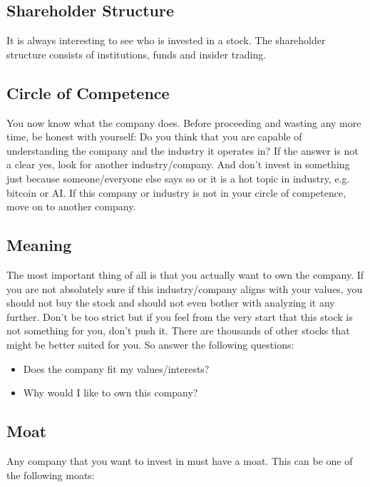 \subsection{Shareholder Structure}

It is always interesting to see who is invested in a stock. The shareholder
structure consists of institutions, funds and insider trading.

\subsection{Circle of Competence}

You now know what the company does. Before proceeding and wasting any more
time, be honest with yourself: Do you think that you are capable of understanding the
company and the industry it operates in? If the answer is not a clear yes, look for another
industry/company. And don’t invest in something just because someone/everyone else
says so or it is a hot topic in industry, e.g. bitcoin or AI. If this company or industry is
not in your circle of competence, move on to another company.

\subsection{Meaning}

The most important thing of all is that you actually want to own the company. If you
are not absolutely sure if this industry/company aligns with your values, you should
not buy the stock and should not even bother with analyzing it any further. Don’t be
too strict but if you feel from the very start that this stock is not something for you,
don’t push it. There are thousands of other stocks that might be better suited for you.
So answer the following questions:

\begin{itemize}
    \item Does the company fit my values/interests?
    \item Why would I like to own this company?
\end{itemize}

\subsection{Moat}

Any company that you want to invest in must have a moat. This can be one of the
following moats:

